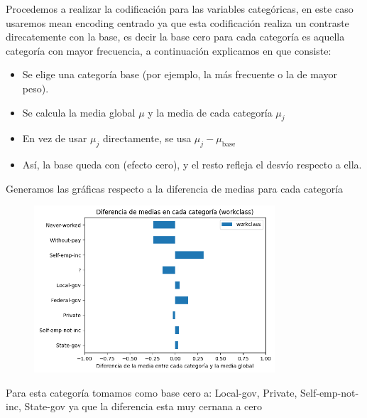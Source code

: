 \documentclass{article}
\begin{document}
	Procedemos a realizar la codificación para las variables categóricas, en este caso usaremos mean encoding centrado ya que esta codificación realiza un contraste direcatemente con la base, es decir la base cero para cada categoría es aquella categoría con mayor frecuencia, a continuación explicamos en que consiste:
	
	\begin{itemize}
		\item Se elige una categoría base (por ejemplo, la más frecuente o la de mayor peso).
		
		\item Se calcula la media global $\mu$ y la media de cada categoría $\mu_j$
	
		\item En vez de usar $\mu_j$ directamente, se usa 
		$\mu_j-\mu_{\text{base}}$
		
		\item Así, la base queda con (efecto cero), y el resto refleja el desvío respecto a ella.
	\end{itemize}
	
	Generamos las gráficas respecto a la diferencia de medias para cada categoría
	
	\begin{figure}[H]
		\centering
		\includegraphics[width=0.8\textwidth]{media_workclass.png}
	\end{figure}
	
	Para esta categoría tomamos como base cero a: Local-gov, Private, Self-emp-not-inc, State-gov ya que la diferencia esta muy cernana a cero
	
\end{document}
